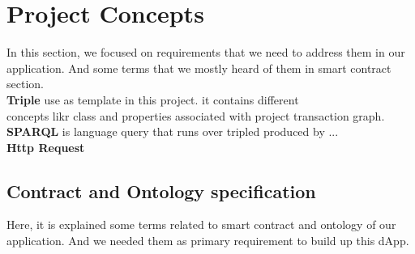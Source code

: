 \section{Project Concepts}

In this section, we focused on requirements that we need to address them in our application.
And some terms that we mostly heard of them in smart contract section.\\
\textbf{Triple} use as template in this project. it contains different \\ concepts likr class and properties associated with project transaction graph.\\
\textbf{SPARQL} is language query that runs over tripled produced by ...\\

\textbf{Http Request} 
\subsection{Contract and Ontology specification}
Here, it is explained some terms related to smart contract and ontology of our application. And we needed them as primary requirement to build up this dApp.
